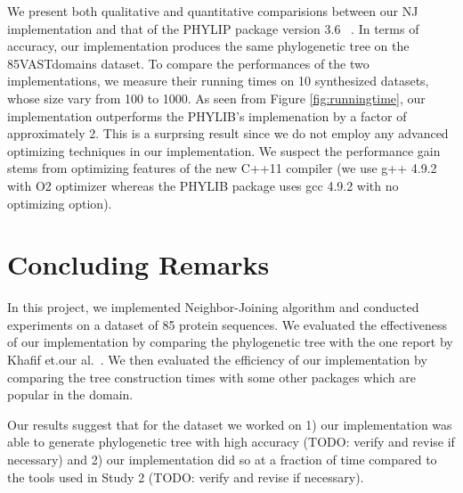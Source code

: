 \documentclass[11pt,letterpaper]{article}
\theoremstyle{definition}
\begin{document}
We present both qualitative and quantitative comparisions between our NJ implementation and that of the PHYLIP package version 3.6 ~\cite{felsenstein2005phylip}. In terms of accuracy, our implementation produces the same phylogenetic tree on the 85VASTdomains dataset. To compare the performances of the two implementations, we measure their running times on 10 synthesized datasets, whose size vary from 100 to 1000. As seen from Figure \ref{fig:runningtime}, our implementation outperforms the PHYLIB's implemenation by a factor of approximately 2. This is a surprsing result since we do not employ any advanced optimizing techniques in our implementation. We suspect the performance gain stems from optimizing features of the new C++11 compiler (we use g++ 4.9.2 with O2 optimizer whereas the PHYLIB package uses gcc 4.9.2 with no optimizing option).  

\section{Concluding Remarks}

In this project, we implemented Neighbor-Joining algorithm and conducted experiments on a dataset of 85 protein sequences. We evaluated the effectiveness of our implementation by comparing the phylogenetic tree with the one report by Khafif et.our  al.~\cite{khafif2014identification}. We then evaluated the efficiency of our implementation by comparing the tree construction times with some other packages which are popular in the domain.

Our results suggest that for the dataset we worked on 1) our implementation was able to generate phylogenetic tree with high accuracy (TODO: verify and revise if necessary) and 2) our implementation did so at a fraction of time compared to the tools used in Study 2 (TODO: verify and revise if necessary).



\end{document}
